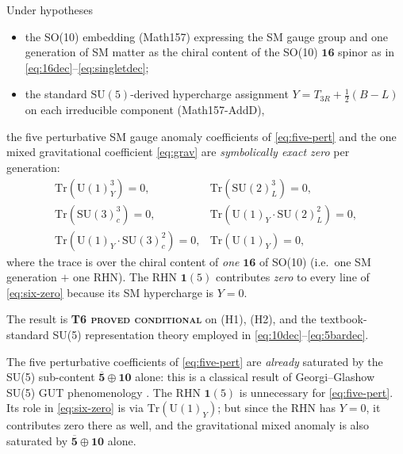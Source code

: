 \begin{theorem}\label{thm:main}
Under hypotheses
\begin{itemize}
  \item[(\textbf{H1})] the SO(10) embedding (Math157) expressing the
    SM gauge group and one generation of SM matter as the chiral
    content of the SO(10) $\mathbf{16}$ spinor as in
    \eqref{eq:16dec}--\eqref{eq:singletdec};
  \item[(\textbf{H2})] the standard $\mathrm{SU}(5)$-derived
    hypercharge assignment $Y=T_{3R}+\tfrac{1}{2}(B-L)$ on each
    irreducible component (Math157-AddD),
\end{itemize}
the five perturbative SM gauge anomaly coefficients of
\eqref{eq:five-pert} and the one mixed gravitational coefficient
\eqref{eq:grav} are \emph{symbolically exact zero} per generation:
\begin{equation}\label{eq:six-zero}
\boxed{\;
\begin{array}{ll}
  \mathrm{Tr}(\mathrm{U}(1)_Y^3) = 0, &
  \mathrm{Tr}(\mathrm{SU}(2)_L^3) = 0, \\
  \mathrm{Tr}(\mathrm{SU}(3)_c^3) = 0, &
  \mathrm{Tr}(\mathrm{U}(1)_Y \cdot \mathrm{SU}(2)_L^2) = 0, \\
  \mathrm{Tr}(\mathrm{U}(1)_Y \cdot \mathrm{SU}(3)_c^2) = 0, &
  \mathrm{Tr}(\mathrm{U}(1)_Y) = 0,
\end{array}\;}
\end{equation}
where the trace is over the chiral content of \emph{one} $\mathbf{16}$
of SO(10) (i.e.\ one SM generation $+$ one RHN). The RHN $\mathbf{1}(5)$
contributes \emph{zero} to every line of \eqref{eq:six-zero} because
its SM hypercharge is $Y=0$.

The result is \textbf{T6 \textsc{proved conditional}} on (H1), (H2),
and the textbook-standard SU(5) representation theory employed in
\eqref{eq:10dec}--\eqref{eq:5bardec}.
\end{theorem}

\begin{remark}\label{rmk:5bar10sat}
The five perturbative coefficients of \eqref{eq:five-pert} are
\emph{already} saturated by the SU(5) sub-content
$\overline{\mathbf{5}}\oplus\mathbf{10}$ alone: this is a
classical result of Georgi--Glashow SU(5) GUT phenomenology
\cite{GeorgiGlashow1974}. The RHN $\mathbf{1}(5)$ is unnecessary for
\eqref{eq:five-pert}. Its role in
\eqref{eq:six-zero} is via $\mathrm{Tr}(\mathrm{U}(1)_Y)$; but since
the RHN has $Y=0$, it contributes zero there as well, and the
gravitational mixed anomaly is also saturated by
$\overline{\mathbf{5}}\oplus\mathbf{10}$ alone.
\end{remark}


